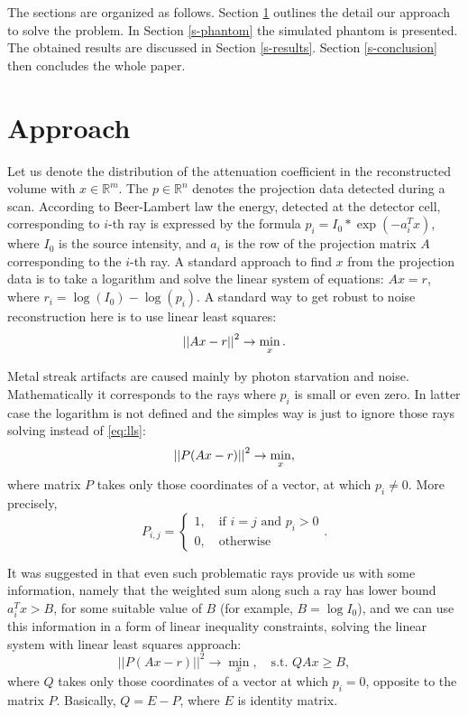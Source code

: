 The sections are organized as follows. Section \ref{s-approach} outlines the detail our approach to solve the problem. In Section \ref{s-phantom} the simulated phantom is presented. The obtained results are discussed in Section \ref{s-results}. Section \ref{s-conclusion} then concludes the whole paper.

\section{Approach}
\label{s-approach}
Let us denote the distribution of the attenuation coefficient in the reconstructed volume with $x \in \mathbb{R}^m$. The $p \in \mathbb{R}^n$ denotes the projection data detected during a scan. According to Beer-Lambert law the energy, detected at the detector cell, corresponding to $i$-th ray is expressed by the formula $p_i = I_0 * \exp(-a_i^T x)$, where $I_0$ is the source intensity, and $a_i$ is the row of the projection matrix $A$ corresponding to the $i$-th ray. A standard approach to find $x$ from the projection data is to take a logarithm and solve the linear system of equations: $Ax = r$, where
$r_i = \log(I_0) - \log(p_i)$. A standard way to get robust to noise reconstruction here is to use linear least squares:
\begin{equation} \label{eq:lls}
  \left|\left| Ax - r \right|\right|^2 \to \min\limits_{x}.
\end{equation}

Metal streak artifacts are caused mainly by photon starvation and noise. Mathematically it corresponds to the rays where $p_i$ is small or even zero. In latter case the logarithm is not defined and the simples way is just to ignore those rays solving instead of \eqref{eq:lls}:
\begin{equation}
  \label{eq:mask-lls}
  \left|\left| P(Ax - r) \right|\right|^2 \to \min\limits_{x},
\end{equation}
where matrix $P$ takes only those coordinates of a vector, at which $p_i \neq 0$. More precisely,
$$
P_{i,j} = \begin{cases}
  1, \quad\text{if $i = j$ and $p_i > 0$} \\
  0, \quad\text{otherwise}
  \end{cases}.
$$

It was suggested in \cite{chukalinaway} that even such problematic rays provide us with some information, namely that the weighted sum along such a ray has lower bound $a_i^T x > B$, for some suitable value of $B$ (for example, $B = \log I_0$), and we can use this information in a form of linear inequality constraints, solving the linear system with linear least squares approach:
\begin{equation}
  ||P(Ax - r)||^2 \to \min\limits_x, \quad\textrm{s.t. }  QAx \ge B,
\end{equation}
where $Q$ takes only those coordinates of a vector at which $p_i = 0$, opposite to the matrix $P$. Basically, $Q = E - P$, where $E$ is identity matrix.

